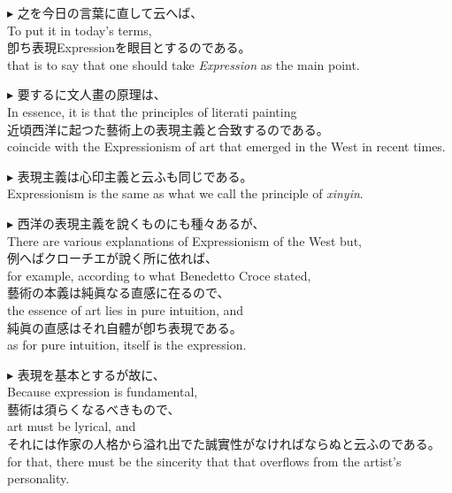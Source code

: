 \documentclass{ctexart}
\makeatletter
\newcommand*{\shifttext}[1]{%
  \settowidth{\@tempdima}{#1}%
  \hspace{-\@tempdima}#1%
}
\newcommand{\plabel}[1]{%
\shifttext{\textbf{#1}\quad}%
}
\makeatother
\begin{document}
\vspace{1em}
\plabel{$\blacktriangleright$}%
之を今日の言葉に直して云へば、\\
To put it in today's terms,\\
卽ち表現Expressionを眼目とするのである。\\
that is to say that one should take \textit{Expression} as the main point.

\vspace{1em}
\plabel{$\blacktriangleright$}%
要するに文人畫の原理は、\\
In essence, it is that the principles of literati painting\\
近頃西洋に起つた藝術上の表現主義と合致するのである。\\
coincide with the Expressionism of art that emerged in the West in recent times.

\vspace{1em}
\plabel{$\blacktriangleright$}%
表現主義は心印主義と云ふも同じである。\\
Expressionism is the same as what we call the principle of \textit{xinyin}.

\vspace{1em}
\plabel{$\blacktriangleright$}%
西洋の表現主義を說くものにも種々あるが、\\
There are various explanations of Expressionism of the West but,\\
例へばクローチエが說く所に依れば、\\
for example, according to what Benedetto Croce stated,\\
藝術の本義は純眞なる直感に在るので、\\
the essence of art lies in pure intuition, and\\
純眞の直感はそれ自體が卽ち表現である。\\
as for pure intuition, itself is the expression.

\vspace{1em}
\plabel{$\blacktriangleright$}%
表現を基本とするが故に、\\
Because expression is fundamental,\\
藝術は須らくなるべきもので、\\
art must be lyrical, and\\
それには作家の人格から溢れ出でた誠實性がなければならぬと云ふのである。\\
for that, there must be the sincerity that that overflows from the artist's personality.
\end{document}
